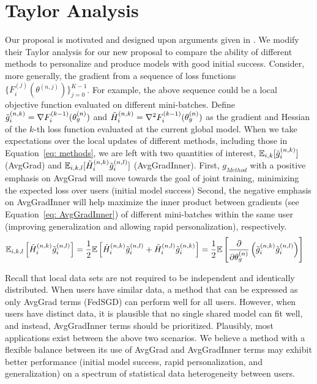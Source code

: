 \documentclass{article}
\begin{document}
%
\section{Taylor Analysis}
\label{sec: taylor}

Our proposal is motivated and designed upon arguments given in \cite{reptile}.
We modify their Taylor analysis for our new proposal to compare the ability of different methods to personalize and produce models with good initial success.
Consider, more generally, the gradient from a sequence of loss functions $\{ F_i^{(j)}(\theta^{(n, j)}) \}_{j = 0}^{K - 1}$. 
For example, the above sequence could be a local objective function evaluated on different mini-batches.
Define $\Tilde{g}_i^{(n, k)} = \nabla F_i^{(k - 1)} (\theta_g^{(n)})$ and $\Tilde{H}_i^{(n, k)} = \nabla^2 F_i^{(k - 1)} (\theta_g^{(n)})$ as the gradient and Hessian of the $k$-th loss function evaluated at the current global model.
When we take expectations over the local updates of different methods, including those in Equation~\ref{eq: methods}, we are left with two quantities of interest, $\mathbb{E}_{i, k} \mathopen[ \Tilde{g}_i^{(n, k)} \mathclose]$ (AvgGrad) and $\mathbb{E}_{i, k, l} \mathopen[ \Tilde{H}_i^{(n, k)} \Tilde{g}_i^{(n, l)} \mathclose]$ (AvgGradInner).
First, $g_{Method}$ with a positive emphasis on AvgGrad will move towards the goal of joint training, minimizing the expected loss over users (initial model success) 
Second, the negative emphasis on AvgGradInner will help maximize the inner product between gradients (see Equation~\ref{eq: AvgGradInner}) of different mini-batches within the same user (improving generalization and allowing rapid personalization), respectively.
\begin{align}
    & \mathbb{E}_{i, k, l} \left[ \Tilde{H}_i^{(n, k)} \Tilde{g}_i^{(n, l)} \right] 
        = \frac{1}{2} \mathbb{E}\left[ \Tilde{H}_i^{(n, k)} \Tilde{g}_i^{(n, l)} + \Tilde{H}_i^{(n, l)} \Tilde{g}_i^{(n, k)} \right] 
        = \frac{1}{2} \mathbb{E}\left[ \frac{\partial}{\partial \theta_g^{(n)}} \left( \Tilde{g}_i^{(n, k)} \Tilde{g}_i^{(n, l)} \right) \right] \label{eq: AvgGradInner}
\end{align}

Recall that local data sets are not required to be independent and identically distributed.
When users have similar data, a method that can be expressed as only AvgGrad terms (FedSGD) can perform well for all users. 
However, when users have distinct data, it is plausible that no single shared model can fit well, and instead, AvgGradInner terms should be prioritized.
Plausibly, most applications exist between the above two scenarios.
We believe a method with a flexible balance between its use of AvgGrad and AvgGradInner terms may exhibit better performance (initial model success, rapid personalization, and generalization) on a spectrum of statistical data heterogeneity between users.
\end{document}
